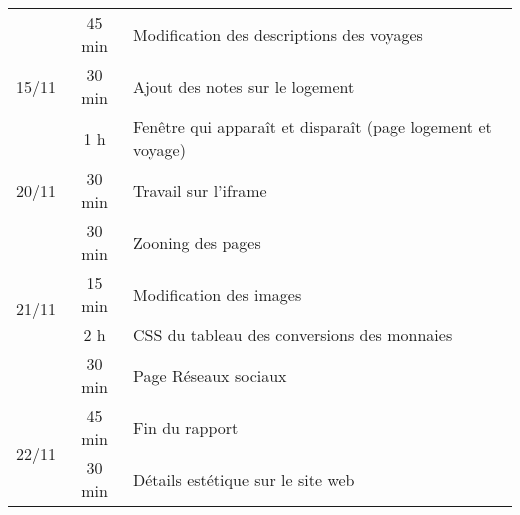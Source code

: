 \begin{center}
\begin{tabular}{|c|c|l|}
    \hline
    \multirow{3}{*}{15/11} & 45 min & Modification des descriptions des voyages \\
        & 30 min & Ajout des notes sur le logement \\
        & 1 h & Fenêtre qui apparaît et disparaît (page logement et voyage) \\
        
    \hline
    20/11 & 30 min & Travail sur l'iframe \\
        
    \hline
    \multirow{4}{*}{21/11} & 30 min & Zooning des pages \\
        & 15 min & Modification des images \\
        & 2 h & CSS du tableau des conversions des monnaies \\
        & 30 min & Page Réseaux sociaux \\
        
    \hline
    \multirow{2}{*}{22/11} & 45 min & Fin du rapport \\
        & 30 min & Détails estétique sur le site web \\
        
    \hline
        

\end{tabular}
\end{center}

